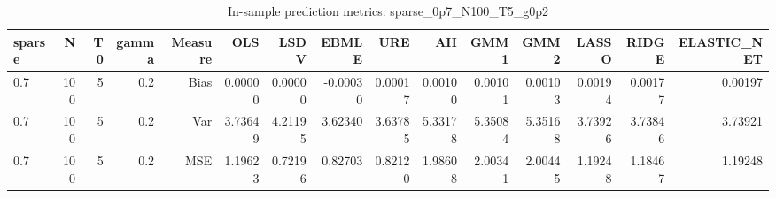 \begin{table}[!htbp]\centering
\caption{In-sample prediction metrics: sparse_0p7_N100_T5_g0p2}
\label{tab:table2_sparse_0p7_N100_T5_g0p2}
\begin{tabular}{lrrrrrrrrrrrrrr}
\hline
sparse & N & T0 & gamma & Measure & OLS & LSDV & EBMLE & URE & AH & GMM1 & GMM2 & LASSO & RIDGE & ELASTIC_NET \\
\hline
0.7 & 100 & 5 & 0.2 & Bias & 0.00000 & 0.00000 & -0.00030 & 0.00017 & 0.00100 & 0.00101 & 0.00103 & 0.00194 & 0.00177 & 0.00197 \\
0.7 & 100 & 5 & 0.2 & Var & 3.73649 & 4.21195 & 3.62340 & 3.63785 & 5.33178 & 5.35084 & 5.35168 & 3.73926 & 3.73846 & 3.73921 \\
0.7 & 100 & 5 & 0.2 & MSE & 1.19623 & 0.72196 & 0.82703 & 0.82120 & 1.98608 & 2.00341 & 2.00445 & 1.19248 & 1.18467 & 1.19248 \\
\hline
\end{tabular}
\end{table}


